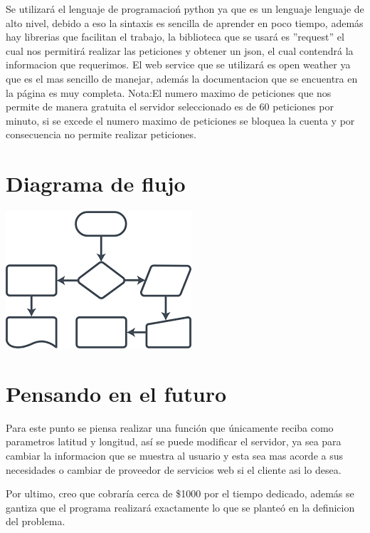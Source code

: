 \documentclass{article}
\begin{document}
Se utilizar\'a el lenguaje de programacio\'n python ya que es un lenguaje 
lenguaje de alto nivel, 
debido a eso la sintaxis es sencilla de aprender en poco tiempo, adem\'as  hay librerias que facilitan
el trabajo, la biblioteca que se usar\'a es ''request'' el cual nos 
permitir\'a realizar las peticiones y obtener un json, el cual contendr\'a la informacion que requerimos.
El web service que se utilizar\'a es open weather ya que es el mas sencillo de manejar, adem\'as la documentacion
que se encuentra en la p\'agina es muy completa.
Nota:El numero maximo de peticiones que nos permite de manera gratuita el 
servidor seleccionado es de 60 peticiones por minuto, si se excede el numero maximo de peticiones
se bloquea la cuenta y por consecuencia no permite realizar peticiones. 

\section{Diagrama de flujo }

\includegraphics{diagrama}

\section{Pensando en el futuro}

Para este punto se piensa realizar una funci\'on que \'unicamente
reciba como parametros latitud y longitud, as\'i se puede modificar el servidor, ya sea para cambiar la informacion que se muestra al 
usuario y esta sea mas acorde a sus necesidades o cambiar de proveedor de servicios web si el cliente asi lo desea.


Por ultimo, creo que cobrar\'ia cerca de \$1000 por el tiempo dedicado, adem\'as se gantiza que el programa realizar\'a exactamente lo que se plante\'o en la definicion del problema.
\end{document}
